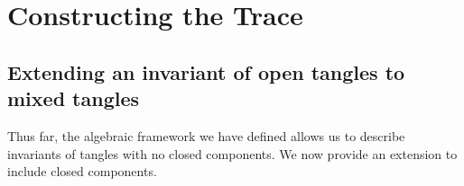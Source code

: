 \chapter{Constructing the Trace}\label{ch:trace}
\section{Extending an invariant of open tangles to mixed tangles}
Thus far, the algebraic framework we have defined allows us to describe
invariants of tangles with no closed components. We now provide an extension to
include closed components.


